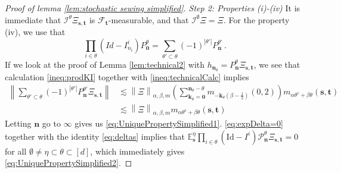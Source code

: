 \documentclass[11pt,oneside,english,reqno]{amsart}
\numberwithin{equation}{section}
\numberwithin{figure}{section}
\theoremstyle{plain}
\theoremstyle{definition}
\theoremstyle{remark}
\theoremstyle{plain}
\theoremstyle{plain}
\theoremstyle{plain}
\theoremstyle{plain}
\theoremstyle{plain}
\newcommand{\cF}{\mathcal{F}}
\newcommand{\cI}{\mathcal{I}}
\newcommand{\cP}{\mathcal{P}}
\newcommand{\EE}{\mathbb{E}}
\newcommand{\bk}{\mathbf{k}}
\newcommand{\bn}{\mathbf{n}}
\newcommand{\boo}{\mathbf{0}}
\newcommand{\bs}{\mathbf{s}}
\newcommand{\bt}{\mathbf{t}}
\newcommand{\Id}{\mathrm{Id}}
\newcommand{\norm}[1]{\left\lVert #1\right\rVert}
\newcommand{\abs}[1]{\left\lvert #1\right\rvert}
\begin{document}
\begin{proof}[Proof of lemma \ref{lem:stochastic sewing simplified}]
\bigskip
    
    \noindent
    \textit{Step 2: Properties (i)-(iv)}
    It is immediate that $\cI^\theta\Xi_{\bs,\bt}$ is $\cF_\bt$-measurable, and that $\cI^\emptyset\Xi =\Xi$. For the property (iv), we use that 
%
    \begin{equation*}
        \prod_{i\in\theta}(Id-I^i_{n_i}) P_{\boo}^\theta = \sum_{\theta'\subset\theta}(-1)^{\abs{\theta'}}P_\bn^{\theta'}\,.
    \end{equation*}
%
    If we look at the proof of Lemma \ref{lem:technical2} with $h_{\bn_\theta} = P^\theta_\bn\Xi_{\bs,\bt}$, we see that calculation \eqref{ineq:prodKI} together with \eqref{ineq:technicalCalc} implies
%
    \begin{align*}
        \norm{\sum_{\theta'\subset\theta}(-1)^{\abs{\theta'}}P_\bn^{\theta'}\Xi_{\bs,\bt}} &\lesssim \norm{\Xi}_{\alpha,\beta,m}\left(\sum_{\bk_\theta = \boo}^{\bn_\theta-\theta}m_{-\bk_\theta(\beta-\frac 12)}\left(0,2\right)\right) m_{\alpha\theta^c+\beta\theta}(\bs,\bt)\\
        &\lesssim \norm{\Xi}_{\alpha,\beta,m}m_{\alpha\theta^c+\beta\theta}(\bs,\bt)
    \end{align*}
%
    Letting $\bn$ go to $\infty$ gives us \eqref{eq:UniquePropertySimplified1}. \eqref{eq:expDelta=0} together with the identity \eqref{eq:deltas} implies that $\EE_\bs^\eta\prod_{i\in\theta}(\Id-I^i)\cP^\theta_{\bn}\Xi_{\bs,\bt} = 0$ for all $\emptyset\neq\eta\subset\theta\subset[d]$, which immediately gives \eqref{eq:UniquePropertySimplified2}.


\end{proof}
\end{document}
